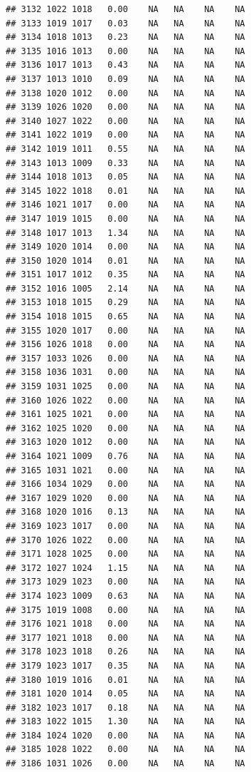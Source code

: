 \documentclass{article}\usepackage{graphicx, color}
\makeatletter
\newenvironment{kframe}{%
 \def\at@end@of@kframe{}%
 \ifinner\ifhmode%
  \def\at@end@of@kframe{\end{minipage}}%
  \begin{minipage}{\columnwidth}%
 \fi\fi%
 \def\FrameCommand##1{\hskip\@totalleftmargin \hskip-\fboxsep
 \colorbox{shadecolor}{##1}\hskip-\fboxsep
     \hskip-\linewidth \hskip-\@totalleftmargin \hskip\columnwidth}%
 \MakeFramed {\advance\hsize-\width
   \@totalleftmargin\z@ \linewidth\hsize
   \@setminipage}}%
 {\par\unskip\endMakeFramed%
 \at@end@of@kframe}
\newenvironment{knitrout}{}{} %
\makeatother
\begin{document}
\begin{knitrout}
\begin{kframe}
\begin{verbatim}
## 3132 1022 1018   0.00    NA   NA    NA    NA
## 3133 1019 1017   0.03    NA   NA    NA    NA
## 3134 1018 1013   0.23    NA   NA    NA    NA
## 3135 1016 1013   0.00    NA   NA    NA    NA
## 3136 1017 1013   0.43    NA   NA    NA    NA
## 3137 1013 1010   0.09    NA   NA    NA    NA
## 3138 1020 1012   0.00    NA   NA    NA    NA
## 3139 1026 1020   0.00    NA   NA    NA    NA
## 3140 1027 1022   0.00    NA   NA    NA    NA
## 3141 1022 1019   0.00    NA   NA    NA    NA
## 3142 1019 1011   0.55    NA   NA    NA    NA
## 3143 1013 1009   0.33    NA   NA    NA    NA
## 3144 1018 1013   0.05    NA   NA    NA    NA
## 3145 1022 1018   0.01    NA   NA    NA    NA
## 3146 1021 1017   0.00    NA   NA    NA    NA
## 3147 1019 1015   0.00    NA   NA    NA    NA
## 3148 1017 1013   1.34    NA   NA    NA    NA
## 3149 1020 1014   0.00    NA   NA    NA    NA
## 3150 1020 1014   0.01    NA   NA    NA    NA
## 3151 1017 1012   0.35    NA   NA    NA    NA
## 3152 1016 1005   2.14    NA   NA    NA    NA
## 3153 1018 1015   0.29    NA   NA    NA    NA
## 3154 1018 1015   0.65    NA   NA    NA    NA
## 3155 1020 1017   0.00    NA   NA    NA    NA
## 3156 1026 1018   0.00    NA   NA    NA    NA
## 3157 1033 1026   0.00    NA   NA    NA    NA
## 3158 1036 1031   0.00    NA   NA    NA    NA
## 3159 1031 1025   0.00    NA   NA    NA    NA
## 3160 1026 1022   0.00    NA   NA    NA    NA
## 3161 1025 1021   0.00    NA   NA    NA    NA
## 3162 1025 1020   0.00    NA   NA    NA    NA
## 3163 1020 1012   0.00    NA   NA    NA    NA
## 3164 1021 1009   0.76    NA   NA    NA    NA
## 3165 1031 1021   0.00    NA   NA    NA    NA
## 3166 1034 1029   0.00    NA   NA    NA    NA
## 3167 1029 1020   0.00    NA   NA    NA    NA
## 3168 1020 1016   0.13    NA   NA    NA    NA
## 3169 1023 1017   0.00    NA   NA    NA    NA
## 3170 1026 1022   0.00    NA   NA    NA    NA
## 3171 1028 1025   0.00    NA   NA    NA    NA
## 3172 1027 1024   1.15    NA   NA    NA    NA
## 3173 1029 1023   0.00    NA   NA    NA    NA
## 3174 1023 1009   0.63    NA   NA    NA    NA
## 3175 1019 1008   0.00    NA   NA    NA    NA
## 3176 1021 1018   0.00    NA   NA    NA    NA
## 3177 1021 1018   0.00    NA   NA    NA    NA
## 3178 1023 1018   0.26    NA   NA    NA    NA
## 3179 1023 1017   0.35    NA   NA    NA    NA
## 3180 1019 1016   0.01    NA   NA    NA    NA
## 3181 1020 1014   0.05    NA   NA    NA    NA
## 3182 1023 1017   0.18    NA   NA    NA    NA
## 3183 1022 1015   1.30    NA   NA    NA    NA
## 3184 1024 1020   0.00    NA   NA    NA    NA
## 3185 1028 1022   0.00    NA   NA    NA    NA
## 3186 1031 1026   0.00    NA   NA    NA    NA

\end{verbatim}
\end{kframe}
\end{knitrout}
\end{document}
